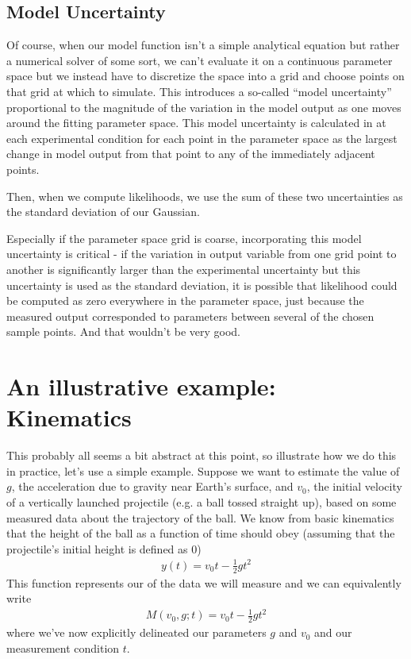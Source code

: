 \documentclass[letterpaper,10pt,english]{sphinxmanual}
\begin{document}
\subsection{Model Uncertainty}
\label{\detokenize{bayesics:model-uncertainty}}\label{\detokenize{bayesics:id1}}
Of course, when our model function isn’t a simple analytical equation but rather a numerical solver of some sort, we can’t evaluate it on a continuous parameter space but we instead have to discretize the space into a grid and choose points on that grid at which to simulate. This introduces a so-called “model uncertainty” proportional to the magnitude of the variation in the model output as one moves around the fitting parameter space. This model uncertainty is calculated in  at each experimental condition for each point in the parameter space as the largest change in model output from that point to any of the immediately adjacent points.

Then, when we compute likelihoods, we use the sum of these two uncertainties as the standard deviation of our Gaussian.

Especially if the parameter space grid is coarse, incorporating this model uncertainty is critical - if the variation in output variable from one grid point to another is significantly larger than the experimental uncertainty but this uncertainty is used as the standard deviation, it is possible that likelihood could be computed as zero everywhere in the parameter space, just because the measured output corresponded to parameters between several of the chosen sample points. And that wouldn’t be very good.


\section{An illustrative example: Kinematics}
\label{\detokenize{bayesics:an-illustrative-example-kinematics}}
This probably all seems a bit abstract at this point, so illustrate how we do this in practice, let’s use a simple example. Suppose we want to estimate the value of \(g\), the acceleration due to gravity near Earth’s surface, and \(v_0\), the initial velocity of a vertically launched projectile (e.g. a ball tossed straight up), based on some measured data about the trajectory of the ball. We know from basic kinematics that the height of the ball as a function of time should obey (assuming that the projectile’s initial height is defined as 0)
\begin{equation}\label{equation:bayesics:bayesics:11}
\begin{split}y(t) = v_0t - \frac 12 gt^2\end{split}
\end{equation}
This function represents our  of the data we will measure and we can equivalently write
\begin{equation}\label{equation:bayesics:bayesics:12}
\begin{split}M(v_0, g; t) = v_0t - \frac 12 gt^2\end{split}
\end{equation}
where we’ve now explicitly delineated our parameters \(g\) and \(v_0\) and our measurement condition \(t\).
\end{document}
